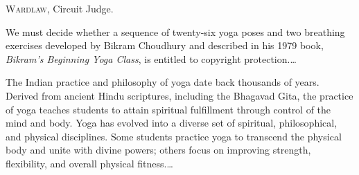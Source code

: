 

\opinion \textsc{Wardlaw}, Circuit Judge.

We must decide whether a sequence of twenty-six yoga poses and two
breathing exercises developed by Bikram Choudhury and described in his
1979 book, \textit{Bikram's Beginning Yoga Class}, is entitled to
copyright protection.\ldots


The Indian practice and philosophy of yoga date back thousands of years.
Derived from ancient Hindu scriptures, including the Bhagavad
Gita, the practice of yoga teaches students to attain spiritual
fulfillment  through control of the mind and body.
Yoga has evolved into a diverse set of spiritual,
philosophical, and physical disciplines. Some students practice yoga to
transcend the physical body and unite with divine powers; others focus
on improving strength, flexibility, and overall physical fitness.\ldots


